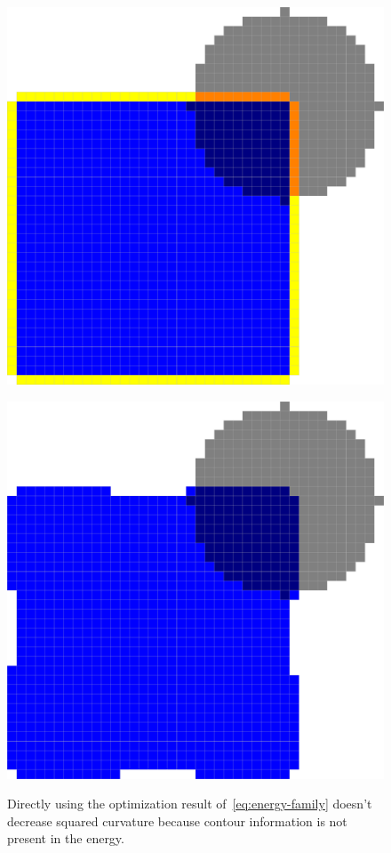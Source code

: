 \begin{figure}
\begin{minipage}{0.5\textwidth}
\center
\includegraphics[scale=0.2]{figures/chapter6/contour-information/before-opt.pdf}
\label{fig:contour-info-1}
\end{minipage}%
\begin{minipage}{0.5\textwidth}
\center
\includegraphics[scale=0.2]{figures/chapter6/contour-information/after-opt.pdf}
\label{fig:contour-info-2}
\end{minipage}%
\caption{ Directly using the optimization result of~\cref{eq:energy-family} doesn't decrease squared curvature because contour information is not present in the energy.}
\label{fig:contour-info}
\end{figure}


